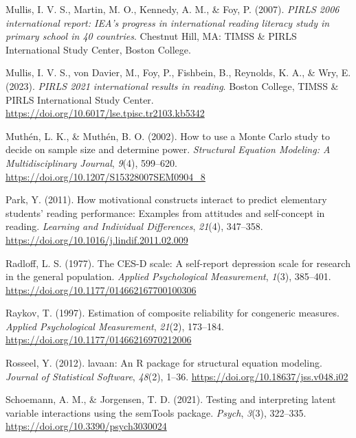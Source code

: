 \documentclass[
  man]{apa6}
\newlength{\cslhangindent}
\newenvironment{CSLReferences}[2] %
 {\begin{list}{}{%
  \setlength{\itemindent}{0pt}
  \setlength{\leftmargin}{0pt}
  \setlength{\parsep}{0pt}
  \ifodd #1
   \setlength{\leftmargin}{\cslhangindent}
   \setlength{\itemindent}{-1\cslhangindent}
  \fi
  \setlength{\itemsep}{#2\baselineskip}}}
 {\end{list}}
\begin{document}
\begin{CSLReferences}{1}{0}
Mullis, I. V. S., Martin, M. O., Kennedy, A. M., \& Foy, P. (2007). \emph{PIRLS 2006 international report: IEA's progress in international reading literacy study in primary school in 40 countries}. Chestnut Hill, MA: TIMSS \& PIRLS International Study Center, Boston College.

Mullis, I. V. S., von Davier, M., Foy, P., Fishbein, B., Reynolds, K. A., \& Wry, E. (2023). \emph{PIRLS 2021 international results in reading}. Boston College, TIMSS \& PIRLS International Study Center. \url{https://doi.org/10.6017/lse.tpisc.tr2103.kb5342}

Muthén, L. K., \& Muthén, B. O. (2002). How to use a {Monte Carlo} study to decide on sample size and determine power. \emph{Structural Equation Modeling: A Multidisciplinary Journal}, \emph{9}(4), 599--620. \url{https://doi.org/10.1207/S15328007SEM0904_8}

Park, Y. (2011). How motivational constructs interact to predict elementary students' reading performance: {Examples} from attitudes and self-concept in reading. \emph{Learning and Individual Differences}, \emph{21}(4), 347--358. \url{https://doi.org/10.1016/j.lindif.2011.02.009}

Radloff, L. S. (1977). The {CES-D} scale: {A} self-report depression scale for research in the general population. \emph{Applied Psychological Measurement}, \emph{1}(3), 385--401. \url{https://doi.org/10.1177/014662167700100306}

Raykov, T. (1997). Estimation of composite reliability for congeneric measures. \emph{Applied Psychological Measurement}, \emph{21}(2), 173--184. \url{https://doi.org/10.1177/01466216970212006}

Rosseel, Y. (2012). {lavaan}: An {R} package for structural equation modeling. \emph{Journal of Statistical Software}, \emph{48}(2), 1--36. \url{https://doi.org/10.18637/jss.v048.i02}

Schoemann, A. M., \& Jorgensen, T. D. (2021). Testing and interpreting latent variable interactions using the {semTools} package. \emph{Psych}, \emph{3}(3), 322--335. \url{https://doi.org/10.3390/psych3030024}


\end{CSLReferences}
\end{document}
